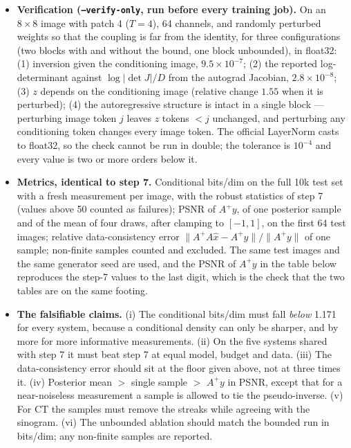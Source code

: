 \documentclass[11pt]{article}
\begin{document}
\begin{itemize}
        images), and the data-consistency floor --- the relative range-space
        discrepancy between the truth and $A^{+}y$, which a perfect sample
        would also show --- is $0.187$ (against $0.203$ for \texttt{denoise}
        and $0.051$--$0.055$ for the $\sigma = 0.05$ systems on the same
        images).
  \item \textbf{Verification (\texttt{--verify-only}, run before every
        training job).} On an $8 \times 8$ image with patch 4 ($T = 4$),
        64 channels, and randomly perturbed weights so that the coupling is
        far from the identity, for three configurations (two blocks with and
        without the bound, one block unbounded), in float32: (1) inversion
        given the conditioning image, $9.5 \times 10^{-7}$; (2) the reported
        log-determinant against $\log|\det J|/D$ from the autograd Jacobian,
        $2.8 \times 10^{-8}$; (3) $z$ depends on the conditioning image
        (relative change $1.55$ when it is perturbed); (4) the autoregressive
        structure is intact in a single block --- perturbing image token $j$
        leaves $z$ tokens $< j$ unchanged, and perturbing any conditioning
        token changes every image token. The official LayerNorm casts to
        float32, so the check cannot be run in double; the tolerance is
        $10^{-4}$ and every value is two or more orders below it.
  \item \textbf{Metrics, identical to step 7.} Conditional bits/dim on the
        full 10k test set with a fresh measurement per image, with the
        robust statistics of step 7 (values above 50 counted as failures);
        PSNR of $A^{+}y$, of one posterior sample and of the mean of four
        draws, after clamping to $[-1,1]$, on the first 64 test images;
        relative data-consistency error $\|A^{+}A\hat{x} - A^{+}y\| /
        \|A^{+}y\|$ of one sample; non-finite samples counted and excluded.
        The same test images and the same generator seed are used, and the
        PSNR of $A^{+}y$ in the table below reproduces the step-7 values to
        the last digit, which is the check that the two tables are on the
        same footing.
  \item \textbf{The falsifiable claims.} (i) The conditional bits/dim must
        fall \emph{below} 1.171 for every system, because a conditional
        density can only be sharper, and by more for more informative
        measurements. (ii) On the five systems shared with step 7 it must
        beat step 7 at equal model, budget and data. (iii) The
        data-consistency error should sit at the floor given above, not at
        three times it. (iv) Posterior mean $>$ single sample $>$ $A^{+}y$
        in PSNR, except that for a near-noiseless measurement a sample is
        allowed to tie the pseudo-inverse. (v) For CT the samples must remove
        the streaks while agreeing with the sinogram. (vi) The unbounded
        ablation should match the bounded run in bits/dim; any non-finite
        samples are reported.
\end{itemize}
\end{document}

